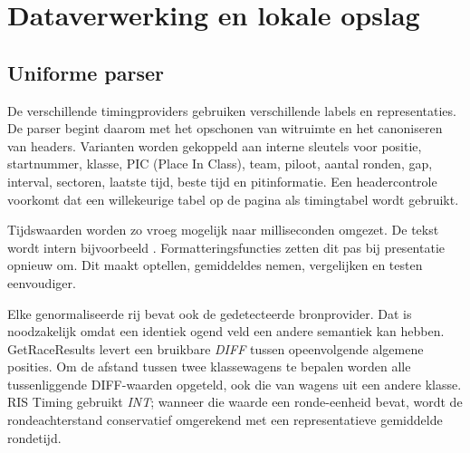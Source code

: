 
\chapter{Dataverwerking en lokale opslag}
\label{chap:data}


\section{Uniforme parser}
De verschillende timingproviders gebruiken verschillende labels en representaties. De parser begint daarom met het
opschonen van witruimte en het canoniseren van headers. Varianten worden gekoppeld aan interne
sleutels voor positie, startnummer, klasse, PIC (Place In Class), team, piloot, aantal ronden, gap, interval,
sectoren, laatste tijd, beste tijd en pitinformatie. Een headercontrole voorkomt dat een
willekeurige tabel op de pagina als timingtabel wordt gebruikt.

Tijdswaarden worden zo vroeg mogelijk naar milliseconden omgezet. De tekst  wordt
intern bijvoorbeeld . Formatteringsfuncties zetten dit pas bij presentatie
opnieuw om. Dit maakt optellen, gemiddeldes nemen, vergelijken en testen eenvoudiger.

Elke genormaliseerde rij bevat ook de gedetecteerde bronprovider. Dat is noodzakelijk omdat een
identiek ogend veld een andere semantiek kan hebben. GetRaceResults levert een bruikbare \emph{DIFF}
tussen opeenvolgende algemene posities. Om de afstand tussen twee klassewagens te bepalen worden
alle tussenliggende DIFF-waarden opgeteld, ook die van wagens uit een andere klasse. RIS Timing
gebruikt \emph{INT}; wanneer die waarde een ronde-eenheid bevat, wordt de rondeachterstand
conservatief omgerekend met een representatieve gemiddelde rondetijd.


